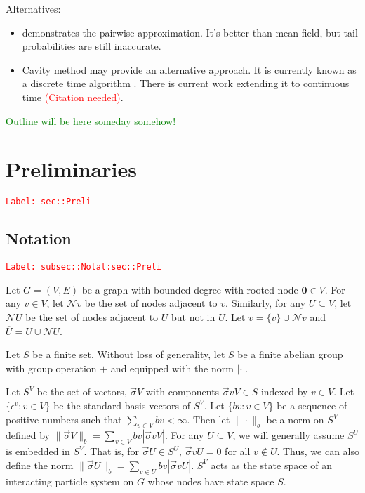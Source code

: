 \documentclass[12pt]{article}
\newcommand{\mc}{\mathcal}
\newcommand{\ov}{\overline}
\newcommand{\ep}{\epsilon}
\newcommand{\tr}{\textcolor{red}}
\newcommand{\tg}{\textcolor{green}}
\newcommand{\labe}[1]{\tr{\texttt{Label: #1}}}
\newcommand{\ind}{\hspace{24pt}}
\newcommand{\neigh}{\mc{N}}					%
\renewcommand{\root}{\mathbf{0}}				%
\renewcommand{\v}{v}							%
\renewcommand{\U}{U}							%
\renewcommand{\S}{S}							%
\newcommand{\s}{\sigma}							%
\newcommand{\sv}{\vec{\s}}						%
\renewcommand{\b}{b}							%
\newcommand{\ev}[1]{\ep^{#1}}					%
\newcommand{\cl}{\ov}							%
\renewcommand{\G}{G}								%
\newcommand{\V}{V}									%
\newcommand{\E}{E}									%
\newcommand{\XState}[1]{\S^{#1}}				%
\begin{document}
Alternatives:

\begin{itemize}
\item \cite{Gas15} demonstrates the pairwise approximation. It's better than mean-field, but tail probabilities are still inaccurate.

\item Cavity method may provide an alternative approach. It is currently known as a discrete time algorithm \cite{Lac15}\cite{KanMon11}. There is current work extending it to continuous time \tr{(Citation needed)}.
\end{itemize}

\tg{Outline will be here someday somehow!}


\section{Preliminaries}
\label{sec::Preli}\labe{sec::Preli}

\subsection{Notation}
\label{subsec::Notat:sec::Preli}\labe{subsec::Notat:sec::Preli}

Let \(\G = (\V,\E)\) be a graph with bounded degree with rooted node \(\root \in \V\). For any \(\v \in \V\), let \(\neigh{\v}\) be the set of nodes adjacent to \(\v\). Similarly, for any \(\U \subseteq \V\), let \(\neigh{\U}\) be the set of nodes adjacent to \(\U\) but not in \(\U\). Let \(\cl{\v} = \{\v\}\cup\neigh{\v}\) and \(\cl{\U} = \U\cup \neigh{\U}\). 

\ind Let \(\S\) be a finite set. Without loss of generality, let \(S\) be a finite abelian group with group operation \(+\) and equipped with the norm \(|\cdot|\). 

\ind Let \(\S^\V\) be the set of vectors, \(\sv{}{\V}\) with components \(\sv{\v}{\V} \in \S\) indexed by \(\v\in \V\). Let \(\{\ev{\v}: \v\in \V\}\) be the standard basis vectors of \(\S^\V\). Let \(\{\b{\v}:\v\in \V\}\) be a sequence of positive numbers such that \(\sum_{\v\in\V} \b{\v} < \infty\). Then let \(\|\cdot\|_{\b{}}\) be a norm on \(\S^\V\) defined by \(\|\sv{}{\V}\|_{\b{}} = \sum_{\v\in\V} \b{\v}|\sv{\v}{\V}|\). For any \(\U\subseteq \V\), we will generally assume \(\S^\U\) is embedded in \(\S^\V\). That is, for \(\sv{}{\U}\in \S^\U\), \(\sv{\v}{\U} = 0\) for all \(\v\notin\U\). Thus, we can also define the norm \(\|\sv{}{\U}\|_{\b{}} = \sum_{\v\in\U} \b{\v}|\sv{\v}{\U}|\). \(\S^\V\) acts as the state space of an interacting particle system on \(\G\) whose nodes have state space \(\S\).
\end{document}
